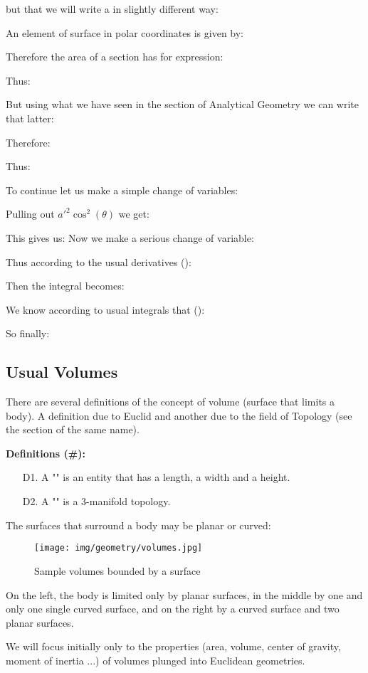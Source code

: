 {	but that we will write a in slightly different way:
	
	An element of surface in polar coordinates is given by:
	
	Therefore the area of a section has for expression:
	
	Thus:
	
	But using what we have seen in the section of Analytical Geometry we can write that latter:
	
	Therefore:
	
	Thus:
	
	To continue let us make a simple change of variables:
	
	Pulling out $a'^2\cos^2(\theta)$ we get:
	
	This gives us:
	Now we make a serious change of variable:
	
	Thus according to the usual derivatives ():
	
	Then the integral becomes:
	
	We know according to usual integrals that ():
	
	So finally:
		
	
	\pagebreak
	\subsection{Usual Volumes}
	There are several definitions of the concept of volume (surface that limits a body). A definition due to Euclid and another due to the field of Topology (see the section of the same name).
	
	\textbf{Definitions (\#\mydef):}
	\begin{enumerate}
		\item[D1.] A "" is an entity that has a length, a width and a height.
		
		\item[D2.] A "" is a 3-manifold topology.
	\end{enumerate}
	The surfaces that surround a body may be planar or curved:
	\begin{figure}[H]
		\centering
		\texttt{[image: img/geometry/volumes.jpg]}
		\caption{Sample volumes bounded by a surface}
	\end{figure}
	On the left, the body is limited only by planar surfaces, in the middle by one and only one single curved surface, and on the right by a curved surface and two planar surfaces.
	\begin{tcolorbox}[title=Remark,colframe=black,arc=10pt]
	We will focus initially only to the properties (area, volume, center of gravity, moment of inertia ...) of volumes plunged into Euclidean geometries.
	\end{tcolorbox}	

}
